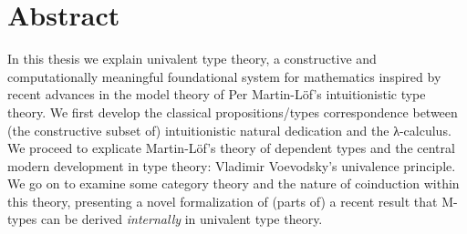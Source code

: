\chapter*{Abstract}

In this thesis we explain univalent type theory, a constructive and
computationally meaningful foundational system for mathematics inspired by
recent advances in the model theory of Per Martin-L\"of's intuitionistic type
theory. We first develop the classical propositions/types correspondence between
(the constructive subset of) intuitionistic natural dedication and the
λ-calculus. We proceed to explicate Martin-L\"of's theory of dependent types and
the central modern development in type theory: Vladimir Voevodsky's univalence
principle. We go on to examine some category theory and the nature of coinduction
within this theory, presenting a novel formalization of (parts of) a recent
result that M-types can be derived \textit{internally} in univalent type theory.
